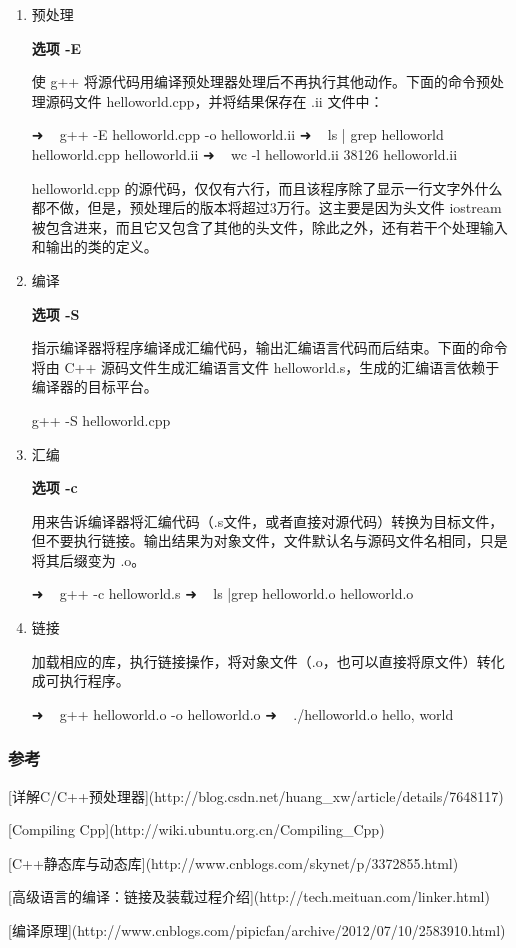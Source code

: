 \begin{enumerate}

\item 预处理

\textbf{选项 -E} 

使 g++ 将源代码用编译预处理器处理后不再执行其他动作。下面的命令预处理源码文件 helloworld.cpp，并将结果保存在 .ii 文件中：

\begin{Code}
    ➜  ~  g++ -E helloworld.cpp -o helloworld.ii
    ➜  ~  ls | grep helloworld
    helloworld.cpp
    helloworld.ii
    ➜  ~  wc -l helloworld.ii
       38126 helloworld.ii
\end{Code}
helloworld.cpp 的源代码，仅仅有六行，而且该程序除了显示一行文字外什么都不做，但是，预处理后的版本将超过3万行。这主要是因为头文件 iostream 被包含进来，而且它又包含了其他的头文件，除此之外，还有若干个处理输入和输出的类的定义。

\item  编译

\textbf{选项 -S} 

指示编译器将程序编译成汇编代码，输出汇编语言代码而后结束。下面的命令将由 C++ 源码文件生成汇编语言文件 helloworld.s，生成的汇编语言依赖于编译器的目标平台。

\begin{Code}
    g++ -S helloworld.cpp
\end{Code}

\item  汇编

\textbf{选项 -c}

 用来告诉编译器将汇编代码（.s文件，或者直接对源代码）转换为目标文件，但不要执行链接。输出结果为对象文件，文件默认名与源码文件名相同，只是将其后缀变为 .o。

\begin{Code}
    ➜  ~  g++ -c helloworld.s
    ➜  ~  ls |grep helloworld.o
    helloworld.o
\end{Code}

\item  链接

加载相应的库，执行链接操作，将对象文件（.o，也可以直接将原文件）转化成可执行程序。

\begin{Code}
    ➜  ~  g++ helloworld.o -o helloworld.o
    ➜  ~  ./helloworld.o
    hello, world 
\end{Code}
\end{enumerate}

\subsubsection{参考} 
 
[详解C/C++预处理器](http://blog.csdn.net/huang_xw/article/details/7648117)  

[Compiling Cpp](http://wiki.ubuntu.org.cn/Compiling_Cpp)
  
[C++静态库与动态库](http://www.cnblogs.com/skynet/p/3372855.html)  

[高级语言的编译：链接及装载过程介绍](http://tech.meituan.com/linker.html)  
  
[编译原理](http://www.cnblogs.com/pipicfan/archive/2012/07/10/2583910.html) 
 


